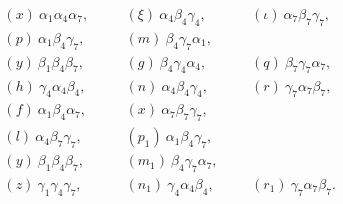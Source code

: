 \documentclass[11pt,a4paper]{book}
\begin{document}
\begin{align*}
&(x)\ \alpha_{1}\alpha_{4}\alpha_{7}, \quad &&(\xi)\ \alpha_{4}\beta_{4}\gamma_{4}, \quad &&(\iota)\ \alpha_{7}\beta_{7}\gamma_{7}, \\
&(p)\ \alpha_{1}\beta_{4}\gamma_{7}, \quad &&(m)\ \beta_{4}\gamma_{7}\alpha_{1}, \\
&(y)\ \beta_{1}\beta_{4}\beta_{7}, \quad &&(g)\ \beta_{4}\gamma_{4}\alpha_{4}, \quad &&(q)\ \beta_{7}\gamma_{7}\alpha_{7}, \\
&(h)\ \gamma_{4}\alpha_{4}\beta_{4}, \quad &&(n)\ \alpha_{4}\beta_{4}\gamma_{4}, \quad &&(r)\ \gamma_{7}\alpha_{7}\beta_{7}, \\
&(f)\ \alpha_{1}\beta_{4}\alpha_{7}, \quad &&(x)\ \alpha_{7}\beta_{7}\gamma_{7}, \\
&(l)\ \alpha_{4}\beta_{7}\gamma_{7}, \quad &&(p_{1})\ \alpha_{1}\beta_{4}\gamma_{7}, \\
&(y)\ \beta_{1}\beta_{4}\beta_{7}, \quad &&(m_{1})\ \beta_{4}\gamma_{7}\alpha_{7}, \\
&(z)\ \gamma_{1}\gamma_{4}\gamma_{7}, \quad &&(n_{1})\ \gamma_{4}\alpha_{4}\beta_{4}, \quad &&(r_{1})\ \gamma_{7}\alpha_{7}\beta_{7}.
\end{align*}
\end{document}
